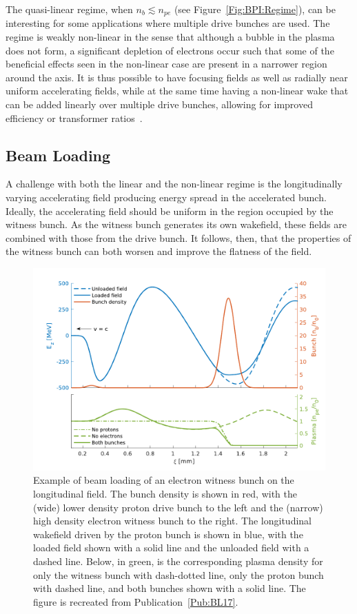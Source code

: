 The quasi-linear regime, when $n_{b} \lesssim n_{pe}$ (see Figure~\ref{Fig:BPI:Regime}), can be interesting for some applications where multiple drive bunches are used.
The regime is weakly non-linear in the sense that although a bubble in the plasma does not form, a significant depletion of electrons occur such that some of the beneficial effects seen in the non-linear case are present in a narrower region around the axis.
It is thus possible to have focusing fields as well as radially near uniform accelerating fields, while at the same time having a non-linear wake that can be added linearly over multiple drive bunches, allowing for improved efficiency or transformer ratios~\cite{muggli:2017,rosenzweig:2010}.

\subsection{Beam Loading}
\label{Int:BPI:BLoad}

A challenge with both the linear and the non-linear regime is the longitudinally varying accelerating field producing energy spread in the accelerated bunch.
Ideally, the accelerating field should be uniform in the region occupied by the witness bunch.
As the witness bunch generates its own wakefield, these fields are combined with those from the drive bunch.
It follows, then, that the properties of the witness bunch can both worsen and improve the flatness of the field.

\begin{figure}[hbt]
    \centering
    \includegraphics[width=0.8125\linewidth,trim={0mm 0mm 0mm 0mm},clip]{figures/BeamLoading}
    \caption{\label{Fig:BPI:BLoad}
        Example of beam loading of an electron witness bunch on the longitudinal field.
        The bunch density is shown in red, with the (wide) lower density proton drive bunch to the left and the (narrow) high density electron witness bunch to the right.
        The longitudinal wakefield driven by the proton bunch is shown in blue, with the loaded field shown with a solid line and the unloaded field with a dashed line.
        Below, in green, is the corresponding plasma density for only the witness bunch with dash-dotted line, only the proton bunch with dashed line, and both bunches shown with a solid line.
        The figure is recreated from Publication~\ref{Pub:BL17}.
    }
\end{figure}

